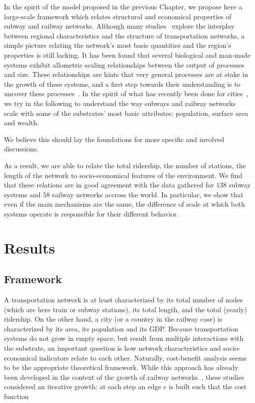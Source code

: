 In the spirit of the model proposed in the previous Chapter, we propose here a
large-scale framework which relates structural and economical properties of
subway and railway networks. Although many
studies~\cite{Kansky:1963,Derrible:2009,Levinson:2012} explore the interplay
between regional characteristics and the structure of transportation networks, a
simple picture relating the network's most basic quantities and the region's
properties is still lacking. It has been found that several biological and
man-made systems exhibit allometric scaling relationships between the output of
processes and size. These relationships are hints that very general processes
are at stake in the growth of these systems, and a first step towards their
understanding is to uncover these
processes~\cite{Banavar:1999,Louf:2014_mobility}. In
the spirit of what has recently been done for cities~\cite{Louf:2014_mobility}, we try in
the following to understand the way subways and railway networks scale with some
of the substrates' most basic attributes: population, surface area and wealth. 

We believe this should lay the foundations for more specific and involved discussions.

As a result, we are able to relate the total ridership, the number of stations,
the length of the network to socio-economical features of the environment. We
find that these relations are in good agreement with the data gathered for $138$
subway systems and $58$ railway networks accross the world. In particular, we
show that even if the main mechanisms are the same, the difference of scale at
which both systems operate is responsible for their different behavior. 


\section{Results}

\subsection{Framework}

A transportation network is at least characterized by its total number of nodes
(which are here train or subway stations), its total length, and the total
(yearly) ridership. On the other hand, a city (or a country in the railway case)
is characterized by its area, its population and its GDP. Because transportation
systems do not grow in empty space, but result from multiple interactions with
the substrate, an important question is how network characteristics and
socio-economical indicators relate to each other. Naturally, cost-benefit
analysis seems to be the appropriate theoretical framework. While this approach
has already been developed in the context of the growth of railway
networks~\cite{Black:1971,Louf:2013_emergence}, these studies considered an iterative
growth: at each step an edge $e$ is built such that the cost function


